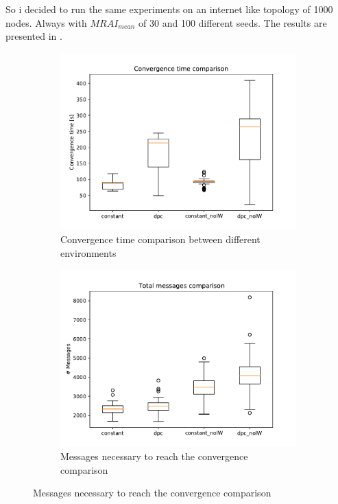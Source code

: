 \documentclass[10pt,conference,letterpaper]{IEEEtran}
\newcommand{\figwidth}{0.78}
\begin{document}
So i decided to run the same experiments on an internet like topology of \num{1000}
nodes.
Always with $MRAI_{mean}$ of \num{30} and \num{100} different seeds.
The results are presented in .

\begin{figure}[tb]
	\centering

	\begin{subfigure}{\columnwidth}
		\centering
		\includegraphics[width=\figwidth\columnwidth]{images/internet_like/dpc-vs-constant-30fixed/constant-dpc-1000-comparison-30fixed_time_boxplot.pdf}
		\caption{Convergence time comparison between different environments}
		\label{fig:dpc_vs_constant_convergence_time_1000}
		\qquad
	\end{subfigure}

	\begin{subfigure}{\columnwidth}
		\centering
		\includegraphics[width=\figwidth\columnwidth]{images/internet_like/dpc-vs-constant-30fixed/constant-dpc-1000-comparison-30fixed_messages_boxplot.pdf}
		\caption{Messages necessary to reach the convergence comparison}
		\label{fig:dpc_vs_constant_messages_1000}
		\qquad
	\end{subfigure}


\end{figure}
\end{document}
